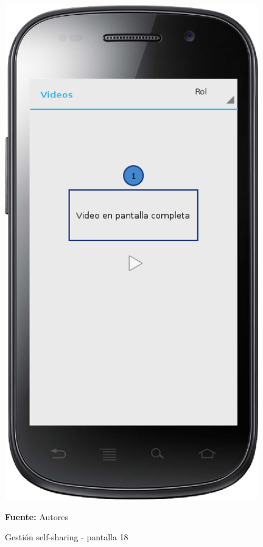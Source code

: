 \begin{figure}[!htb]
  \begin{center}
    \includegraphics[width=11cm]{./imagenes/UI/Self_sharing/self_sharing_18.png}
    \caption{Gestión self-sharing - pantalla 18}
    \label{fig:self_sharing_18}
    \textbf{Fuente:}  Autores
  \end{center}
\end{figure}